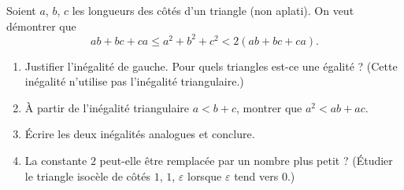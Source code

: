 Soient $a$, $b$, $c$ les longueurs des côtés d'un triangle (non aplati). On
veut démontrer que
\[
ab + bc + ca \leqslant a^2 + b^2 + c^2 < 2(ab + bc + ca).
\]
\begin{enumerate}
  \item Justifier l'inégalité de gauche. Pour quels triangles est-ce une
  égalité ? (Cette inégalité n'utilise pas l'inégalité triangulaire.)
  \item À partir de l'inégalité triangulaire $a < b + c$, montrer que
  $a^2 < ab + ac$.
  \item Écrire les deux inégalités analogues et conclure.
  \item La constante $2$ peut-elle être remplacée par un nombre plus petit ?
  (Étudier le triangle isocèle de côtés $1$, $1$, $\varepsilon$ lorsque
  $\varepsilon$ tend vers $0$.)
\end{enumerate}
